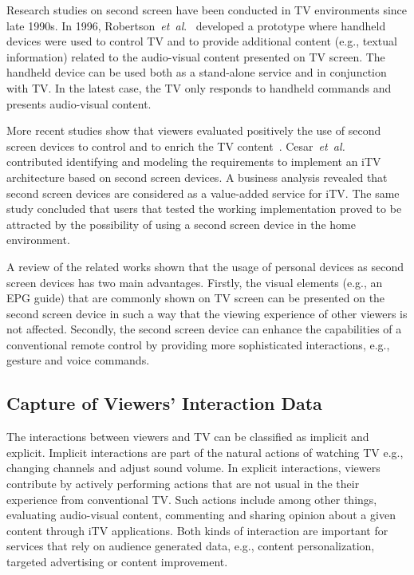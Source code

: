 \documentclass[journal]{IEEEtran}
\begin{document}
Research studies on second screen have been conducted in TV environments since late 1990s. In 1996, Robertson~\emph{et~al}.~\cite{Robertson1996} developed a prototype where handheld devices were used to control TV and to provide additional content (e.g., textual information) related to the audio-visual content presented on TV screen. The handheld device can be used both as a stand-alone service and in conjunction with TV. In the latest case, the TV only responds to handheld commands and presents audio-visual content.

More recent studies show that viewers evaluated positively the use of second screen devices to control and to enrich the TV content~\cite{Cesar2008,Cesar2011,Tsekleves2011}. Cesar~\emph{et~al.}~\cite{Cesar2009} contributed identifying and modeling the requirements to implement an iTV architecture based on second screen devices. A business analysis revealed that second screen devices are considered as a value-added service for iTV. The same study concluded that users that tested the working implementation proved to be attracted by the possibility of using a second screen device in the home environment.

A review of the related works shown that the usage of personal devices as second screen devices has two main advantages. Firstly, the visual elements (e.g., an EPG guide) that are commonly shown on TV screen can be presented on the second screen device in such a way that the viewing experience of other viewers is not affected. Secondly, the second screen device can enhance the capabilities of a conventional remote control by providing more sophisticated interactions, e.g., gesture and voice commands. 

\subsection{Capture of Viewers' Interaction Data}
\label{ssec_capture_viewers_int_data}

The interactions between viewers and TV can be classified as implicit and explicit. Implicit interactions are part of the natural actions of watching TV e.g., changing channels and adjust sound volume. In explicit interactions, viewers contribute by actively performing actions that are not usual in the their experience from conventional TV. Such actions include among other things, evaluating audio-visual content, commenting and sharing opinion about a given content through iTV applications. Both kinds of interaction are important for services that rely on audience generated data, e.g., content personalization, targeted advertising or content improvement.
\end{document}
